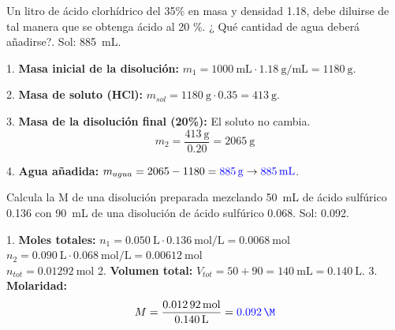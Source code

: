 \begin{exercise}
    Un litro de ácido clorhídrico del 35\% en masa y densidad \qty{1.18}{\gpcc}, debe diluirse de tal manera que se obtenga ácido al 20 \%. ¿ Qué cantidad de agua deberá añadirse?.
    Sol: \qty{885}{\mL}.

    \begin{solu}
        1. \textbf{Masa inicial de la disolución:} $m_1 = \qty{1000}{\mL} \cdot \qty{1.18}{\g\per\mL} = \qty{1180}{\g}$.

        2. \textbf{Masa de soluto (HCl):} $m_{sol} = \qty{1180}{\g} \cdot 0.35 = \qty{413}{\g}$.

        3. \textbf{Masa de la disolución final (20\%):} El soluto no cambia.
        \[ m_2 = \dfrac{\qty{413}{\g}}{0.20} = \qty{2065}{\g} \]

        4. \textbf{Agua añadida:} $m_{agua} = 2065 - 1180 = \mathbf{\textcolor{blue}{\qty{885}{\g}}} \rightarrow \mathbf{\textcolor{blue}{\qty{885}{\mL}}}$.
    \end{solu}
\end{exercise}

\begin{exercise}
    Calcula la M de una disolución preparada mezclando \qty{50}{\mL} de ácido sulfúrico \qty{0.136}{\M} con \qty{90}{\mL} de una disolución de ácido sulfúrico \qty{0.068}{\M}.
    Sol: \qty{0.092}{\M}.
    \begin{solu}
        1. \textbf{Moles totales:}
        $n_1 = \qty{0.050}{\L} \cdot \qty{0.136}{\mol\per\L} = \qty{0.0068}{\mol}$ \\
        $n_2 = \qty{0.090}{\L} \cdot \qty{0.068}{\mol\per\L} = \qty{0.00612}{\mol}$ \\
        $n_{tot} = \qty{0.01292}{\mol}$
        2. \textbf{Volumen total:} $V_{tot} = 50 + 90 = \qty{140}{\mL} = \qty{0.140}{\L}$.
        3. \textbf{Molaridad:}
        \[ M = \dfrac{\qty{0.01292}{\mol}}{\qty{0.140}{\L}} = \mathbf{\textcolor{blue}{\qty{0.092}{\M}}} \]
    \end{solu}
\end{exercise}


